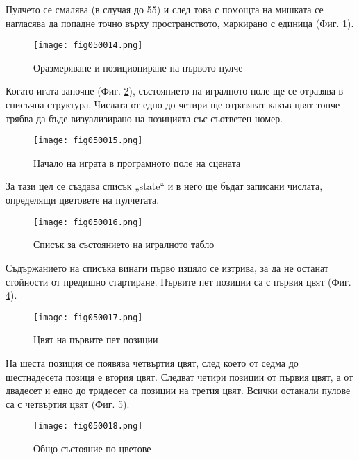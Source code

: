 Пулчето се смалява (в случая до 55) и след това с помощта на мишката се нагласява да попадне точно върху пространството, маркирано с единица (Фиг. \ref{fig050014}). 

\begin{figure}[H]
  \centering
  \texttt{[image: fig050014.png]}
  \caption{Оразмеряване и позициониране на първото пулче}
\label{fig050014}
\end{figure}

Когато игата започне (Фиг. \ref{fig050015}), състоянието на игралното поле ще се отразява в списъчна структура. Числата от едно до четири ще отразяват какъв цвят топче трябва да бъде визуализирано на позицията със съответен номер.

\begin{figure}[H]
  \centering
  \texttt{[image: fig050015.png]}
  \caption{Начало на играта в програмното поле на сцената}
\label{fig050015}
\end{figure}

За тази цел се създава списък „state“ и в него ще бъдат записани числата, определящи цветовете на пулчетата. 

\begin{figure}[H]
  \centering
  \texttt{[image: fig050016.png]}
  \caption{Списък за състоянието на игралното табло}
\label{fig050016}
\end{figure}

Съдържанието на списъка винаги първо изцяло се изтрива, за да не останат стойности от предишно стартиране. Първите пет позиции са с първия цвят (Фиг. \ref{fig050017}).

\begin{figure}[H]
  \centering
  \texttt{[image: fig050017.png]}
  \caption{Цвят на първите пет позиции}
\label{fig050017}
\end{figure}

На шеста позиция се появява четвъртия цвят, след което от седма до шестнадесета позиця е втория цвят. Следват четири позиции от първия цвят, а от двадесет и едно до тридесет са позиции на третия цвят. Всички останали пулове са с четвъртия цвят (Фиг. \ref{fig050018}).

\begin{figure}[H]
  \centering
  \texttt{[image: fig050018.png]}
  \caption{Общо състояние по цветове}
\label{fig050018}
\end{figure}


